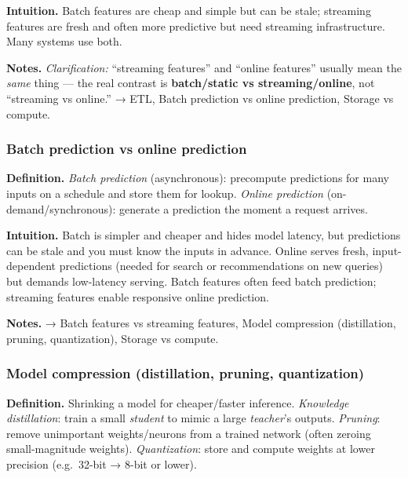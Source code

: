 \documentclass[
  10pt,
  letterpaper,
  onecolumn]{article}
\begin{document}
\textbf{Intuition.} Batch features are cheap and simple but can be
stale; streaming features are fresh and often more predictive but need
streaming infrastructure. Many systems use both.

\textbf{Notes.} \emph{Clarification:} ``streaming features'' and
``online features'' usually mean the \emph{same} thing --- the real
contrast is \textbf{batch/static vs streaming/online}, not ``streaming
vs online.'' → ETL, Batch prediction vs online prediction, Storage vs
compute.

\hypertarget{batch-prediction-vs-online-prediction}{%
\subsubsection{Batch prediction vs online
prediction}\label{batch-prediction-vs-online-prediction}}

\textbf{Definition.} \emph{Batch prediction} (asynchronous): precompute
predictions for many inputs on a schedule and store them for lookup.
\emph{Online prediction} (on-demand/synchronous): generate a prediction
the moment a request arrives.

\textbf{Intuition.} Batch is simpler and cheaper and hides model
latency, but predictions can be stale and you must know the inputs in
advance. Online serves fresh, input-dependent predictions (needed for
search or recommendations on new queries) but demands low-latency
serving. Batch features often feed batch prediction; streaming features
enable responsive online prediction.

\textbf{Notes.} → Batch features vs streaming features, Model
compression (distillation, pruning, quantization), Storage vs compute.

\hypertarget{model-compression-distillation-pruning-quantization}{%
\subsubsection{Model compression (distillation, pruning,
quantization)}\label{model-compression-distillation-pruning-quantization}}

\textbf{Definition.} Shrinking a model for cheaper/faster inference.
\emph{Knowledge distillation}: train a small \emph{student} to mimic a
large \emph{teacher}'s outputs. \emph{Pruning}: remove unimportant
weights/neurons from a trained network (often zeroing small-magnitude
weights). \emph{Quantization}: store and compute weights at lower
precision (e.g.~32-bit → 8-bit or lower).
\end{document}
